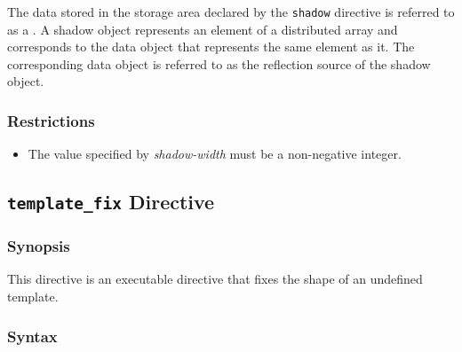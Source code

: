 The data stored in the storage area declared by the {\tt shadow}
directive is referred to as a .
%
A shadow object represents an element of a distributed array and 
corresponds to the data object that represents the same
element as it. The corresponding data object is referred to as the
reflection source of the shadow object.



\subsubsection*{Restrictions}

\begin{itemize}
\item The value specified by {\it shadow-width} must be a non-negative
      integer.
\end{itemize}


\subsection{{\tt template\_fix} Directive}
\label{subsec:template_fix directive}

\subsubsection*{Synopsis}
This directive is an executable directive that fixes the shape of an
undefined template. 

\subsubsection*{Syntax}

